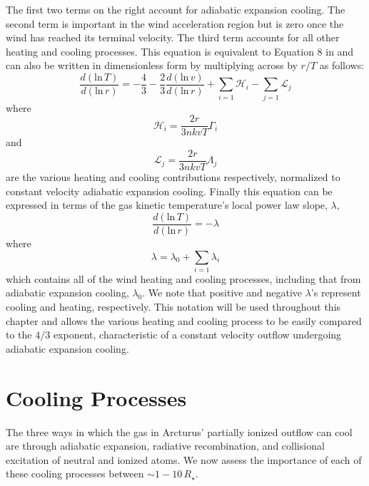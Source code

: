 The first two terms on the right account for adiabatic expansion cooling. The second term is important in the wind acceleration region but is zero once the wind has reached its terminal velocity. The third term accounts for all other heating and cooling processes. This equation is equivalent to Equation 8 in \cite{goldreich_1976} and can also be written in dimensionless form \citep{rodgers_1991} by multiplying across by $r/T$ as follows:
\begin{equation} 
\label{eq:1.8}
\frac{d(\mathrm{ln}\,T)}{d(\mathrm{ln}\,r)}=-\frac{4}{3}-\frac{2}{3}\frac{d(\mathrm{ln}\,v)}{d(\mathrm{ln}\,r)}+\displaystyle\sum_{i=1}\mathcal{H}_{i}-\displaystyle\sum_{j=1}\mathcal{L}_{j}
\end{equation} 
where 
\begin{equation}
\mathcal{H}_{i}=\frac{2r}{3nkvT}\Gamma_{i} 
\end{equation} 
and 
\begin{equation}
\label{eq:1.10}
\mathcal{L}_{j}=\frac{2r}{3nkvT}\Lambda_{j}
\end{equation} 
are the various heating and cooling contributions respectively, normalized to constant velocity adiabatic expansion cooling. Finally this equation can be expressed in terms of the gas kinetic temperature's local power law slope, $\lambda$, 
\begin{equation} \label{eq:lambda}
\frac{d(\mathrm{ln}\,T)}{d(\mathrm{ln}\,r)}=-\lambda
\end{equation}
where 
\begin{equation}
\lambda =\lambda_{0}+\displaystyle\sum_{i=1}\lambda_{i}
\end{equation} 
which contains all of the wind heating and cooling processes, including that from adiabatic expansion cooling, $\lambda_{0}$. We note that positive and negative $\lambda$'s represent cooling and heating, respectively. This notation will be used throughout this chapter and allows the various heating and cooling process to be easily compared to the $4/3$ exponent, characteristic of a constant velocity outflow undergoing adiabatic expansion cooling.

\section{Cooling Processes}\label{sec:3}
The three ways in which the gas in Arcturus' partially ionized outflow can cool are through adiabatic expansion, radiative recombination, and collisional excitation of neutral and ionized atoms. We now assess the importance of each of these cooling processes between $\sim 1-10\,R_{\star}$. 

